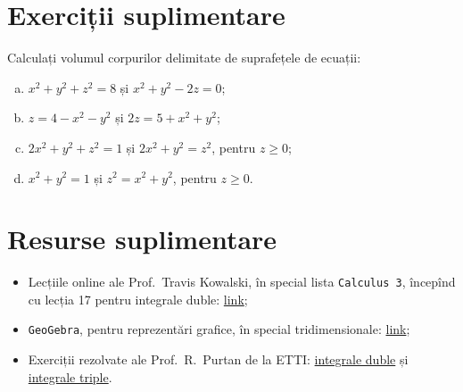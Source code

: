 \section{Exerciții suplimentare}

Calculați volumul corpurilor delimitate de suprafețele de ecuații:

\begin{enumerate}[(a)]
    \item $ x^2 + y^2 + z^2 = 8 $ și $ x^2 + y^2 - 2z = 0 $;
    \item $ z = 4 - x^2 - y^2 $ și $ 2z = 5 + x^2 + y^2 $;
    \item $ 2x^2 + y^2 + z^2 = 1 $ și $ 2x^2 + y^2 = z^2 $, pentru $ z \geq 0 $;
    \item $ x^2 + y^2 = 1 $ și $ z^2 = x^2 + y^2 $, pentru $ z \geq 0 $.
\end{enumerate}



\section{Resurse suplimentare}

\begin{itemize}
    \item Lecțiile online ale Prof.\ Travis Kowalski, în special lista
        \texttt{Calculus 3}, începînd cu lecția 17 pentru integrale duble:
        \href{https://www.youtube.com/watch?v=le1JlwBkAog&list=PLE7F8F33E161D1425&index=23}{link};
    \item \texttt{GeoGebra}, pentru reprezentări grafice, în special
        tridimensionale: \href{https://www.geogebra.org/3d?lang=en}{link};
    \item Exerciții rezolvate ale Prof.\ R.\ Purtan de la ETTI:
        \href{https://adrianmanea.xyz/docs/18-19-etti-am1/purtan-int-duble.pdf}{integrale duble}
        și \href{https://adrianmanea.xyz/docs/18-19-etti-am1/purtan-int-triple.pdf}{integrale triple}.
\end{itemize}
